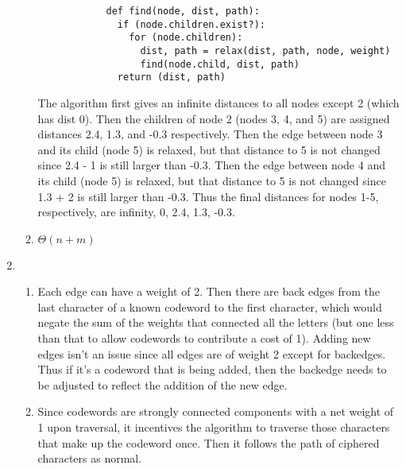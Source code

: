 \documentclass[11pt, letterpaper]{article}
\begin{document}
\begin{enumerate}
\begin{enumerate}
\begin{lstlisting}
            def find(node, dist, path):
              if (node.children.exist?):
                for (node.children):
                  dist, path = relax(dist, path, node, weight)
                  find(node.child, dist, path)
              return (dist, path)
          \end{lstlisting}
          The algorithm first gives an infinite distances to all nodes except 2 (which has dist 0).
          Then the children of node 2 (nodes 3, 4, and 5) are assigned distances 2.4, 1.3, and -0.3 respectively.
          Then the edge between node 3 and its child (node 5) is relaxed, but that distance to 5 is not changed since 2.4 - 1 is still larger than -0.3.
          Then the edge between node 4 and its child (node 5) is relaxed, but that distance to 5 is not changed since 1.3 + 2 is still larger than -0.3.
          Thus the final distances for nodes 1-5, respectively, are infinity, 0, 2.4, 1.3, -0.3.
        \item
          $\Theta (n + m)$
      \end{enumerate}
    \item
      \begin{enumerate}
        \item
          Each edge can have a weight of 2. Then there are back edges from the last character of a known codeword to the first character,
          which would negate the sum of the weights that connected all the letters (but one less than that to allow codewords to contribute
          a cost of 1). Adding new edges isn't an issue since all edges are of weight 2 except for backedges. Thus if it's a codeword that
          is being added, then the backedge needs to be adjusted to reflect the addition of the new edge.
        \item
          Since codewords are strongly connected components with a net weight of 1 upon traversal, it incentives the algorithm to traverse
          those characters that make up the codeword once. Then it follows the path of ciphered characters as normal.
      \end{enumerate}
  \end{enumerate}
\end{document}

